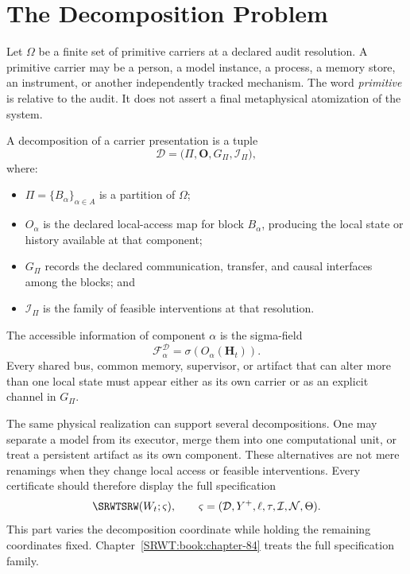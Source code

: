 \section{The Decomposition Problem}

Let \(\Omega\) be a finite set of primitive carriers at a declared audit
resolution. A primitive carrier may be a person, a model instance, a process,
a memory store, an instrument, or another independently tracked mechanism.
The word \emph{primitive} is relative to the audit. It does not assert a final
metaphysical atomization of the system.

\begin{SRWTdefinition}\label{SRWT:def:system-decomposition}
A decomposition of a carrier presentation is a tuple
\[
\mathcal D
=
\bigl(
\Pi,\mathbf O,G_{\Pi},\mathcal I_{\Pi}
\bigr),
\]
where:
\begin{itemize}
\item \(\Pi=\{B_\alpha\}_{\alpha\in A}\) is a partition of \(\Omega\);
\item \(O_\alpha\) is the declared local-access map for block \(B_\alpha\),
 producing the local state or history available at that component;
\item \(G_{\Pi}\) records the declared communication, transfer, and causal
 interfaces among the blocks; and
\item \(\mathcal I_{\Pi}\) is the family of feasible interventions at that
 resolution.
\end{itemize}
The accessible information of component \(\alpha\) is the sigma-field
\[
\mathscr F_\alpha^{\mathcal D}
=
\sigma\!\left(O_\alpha(\mathbf H_t)\right).
\]
Every shared bus, common memory, supervisor, or artifact that can alter more
than one local state must appear either as its own carrier or as an explicit
channel in \(G_{\Pi}\).
\end{SRWTdefinition}

The same physical realization can support several decompositions. One may
separate a model from its executor, merge them into one computational unit, or
treat a persistent artifact as its own component. These alternatives are not
mere renamings when they change local access or feasible interventions. Every certificate should therefore display the full specification
\[
\SRWTSRW(W_t;\varsigma),
\qquad
\varsigma=(\mathcal D,Y^+,\ell,\tau,\mathcal I,\mathcal N,\Theta).
\]
This part varies the decomposition coordinate while holding the remaining
coordinates fixed. Chapter~\ref{SRWT:book:chapter-84} treats the full specification family.

